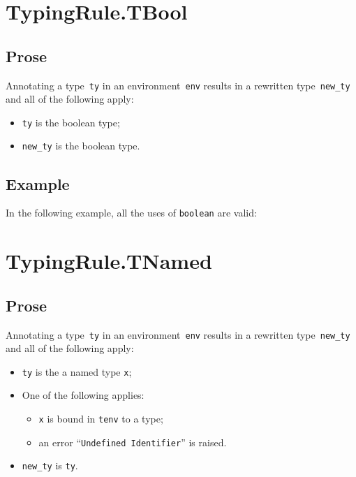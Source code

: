 \documentclass{book}
\begin{document}
\begin{itemize}




\section{TypingRule.TBool \label{sec:TypingRule.TBool}}

\subsection{Prose}
Annotating a type~\texttt{ty} in an environment~\texttt{env} results in a
rewritten type~\texttt{new\_ty} and all of the following apply:
\begin{itemize}
  \item \texttt{ty} is the boolean type;
  \item \texttt{new\_ty} is the boolean type.
\end{itemize}

\subsection{Example}
In the following example, all the uses of \texttt{boolean} are valid:






\section{TypingRule.TNamed \label{sec:TypingRule.TNamed}}

\subsection{Prose}
Annotating a type~\texttt{ty} in an environment~\texttt{env} results in a
rewritten type~\texttt{new\_ty} and all of the following apply:
\begin{itemize}
  \item \texttt{ty} is the a named type \texttt{x};
  \item One of the following applies:
    \begin{itemize}
      \item \texttt{x} is bound in \texttt{tenv} to a type;
      \item an error ``\texttt{Undefined Identifier}'' is raised.
    \end{itemize}
  \item \texttt{new\_ty} is \texttt{ty}.
\end{itemize}


\end{itemize}
\end{document}
